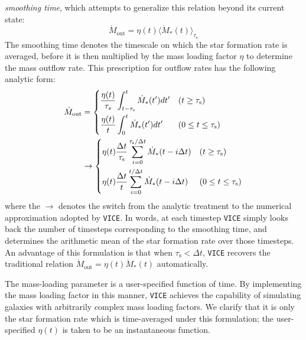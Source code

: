 \documentclass{report}
\begin{document}
\textit{smoothing time}, which attempts to generalize this relation beyond 
its current state: 
\begin{equation}
\label{eq:mdot_out}
\dot{M}_\text{out} = \eta(t)\langle\dot{M}_*(t)\rangle_{\tau_\text{s}}
\end{equation}
The smoothing time denotes the timescale on which the star formation rate is 
averaged, before it is then multiplied by the mass loading factor $\eta$ to 
determine the mass outflow rate. This prescription for outflow rates has the 
following analytic form: 
\begin{subequations}\begin{align}
\dot{M}_\text{out} &= \begin{dcases}
\frac{\eta(t)}{\tau_s}\int_{t - \tau_\text{s}}^{t}\dot{M}_*(t')dt' & 
(t \geq \tau_\text{s}) \\ 
\frac{\eta(t)}{t}\int_{0}^{t} \dot{M}_*(t')dt' & (0 \leq t \leq \tau_\text{s}) 
\end{dcases} \\ 
&\rightarrow \begin{dcases}
\eta(t)\frac{\Delta t}{\tau_\text{s}}\sum_{i = 0}^{\tau_\text{s}/\Delta t}
\dot{M}_*(t - i\Delta t) & (t \geq \tau_\text{s}) \\ 
\eta(t)\frac{\Delta t}{t}\sum_{i = 0}^{t/\Delta t}\dot{M}_*(t - i\Delta t) & 
(0 \leq t \leq \tau_\text{s})
\end{dcases}
\end{align}\end{subequations}
where the $\rightarrow$ denotes the switch from the analytic treatment to 
the numerical approximation adopted by \texttt{VICE}. In words, at each 
timestep \texttt{VICE} simply looks back the number of timesteps corresponding 
to the smoothing time, and determines the arithmetic mean of the star 
formation rate over those timesteps. An advantage of this formulation is that 
when $\tau_\text{s} < \Delta t$, \texttt{VICE} recovers the traditional 
relation $\dot{M}_\text{out} = \eta(t)\dot{M}_*(t)$ automatically. 
\par
The mass-loading parameter is a user-specified function of time. By 
implementing the mass loading factor in this manner, \texttt{VICE} achieves 
the capability of simulating galaxies with arbitrarily complex mass loading 
factors. We clarify that it is only the star formation rate which is 
time-averaged under this formulation; the user-specified $\eta(t)$ is taken 
to be an instantaneous function. 
\par\null\par
\end{document}
